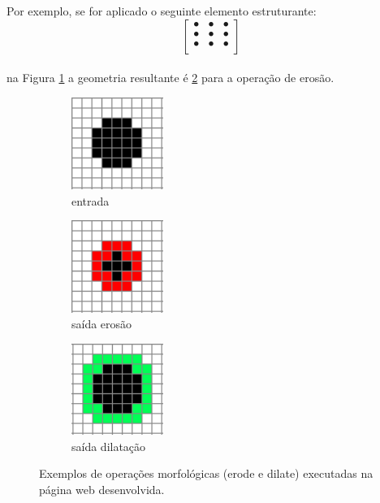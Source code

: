 \documentclass[conference,harvard,brazil,english]{sbatex}
\begin{document}
Por exemplo, se for aplicado o seguinte elemento estruturante:
\\
\[\begin{bmatrix}
    \bullet & \bullet & \bullet \\
    \bullet & \bullet & \bullet \\
    \bullet & \bullet & \bullet \\
\end{bmatrix}\]
\\ na Figura \ref{operacoes_in} a geometria resultante é \ref{operacoes_e} para a operação de erosão.
\begin{figure}[htp]
\centering
	\begin{subfigure}{0.5\textwidth}
	    \centering
		\includegraphics[width=3cm]{pdi_in.PNG}
    	\caption{entrada}
		\label{operacoes_in}
  	\end{subfigure}
	\begin{subfigure}{0.5\textwidth}
	    \centering
      	\includegraphics[width=3cm]{pdi_erode.PNG}
      	\caption{saída erosão}
		\label{operacoes_e}
    \end{subfigure}
	\begin{subfigure}{0.5\textwidth}
	    \centering
      	\includegraphics[width=3cm]{pdi_dilate.PNG}
      	\caption{saída dilatação}
		\label{operacoes_d}
    \end{subfigure}
\caption{Exemplos de operações morfológicas (erode e dilate) executadas na página web desenvolvida.}
\label{operacoes}
\end{figure}
\end{document}
